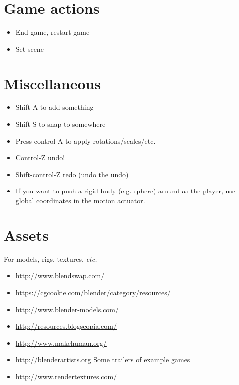 \documentclass[]{article}
\newcommand{\bi}{\begin{itemize}}
\newcommand{\ii}{\item}
\newcommand{\ei}{\end{itemize}}
\newcommand{\sect}[1]{\section{\bf #1}}
\begin{document}
\sect{Game actions}
\bi
\ii End game, restart game
\ii Set scene
\ei

\sect{Miscellaneous}

\bi
\ii Shift-A to add something
\ii Shift-S to snap to somewhere
\ii Press control-A to apply rotations/scales/etc.
\ii Control-Z undo!
\ii Shift-control-Z redo (undo the undo)
\ii If you want to push a rigid body (e.g. sphere) around as the player,
use global coordinates in the motion actuator. 
\ei

\sect{Assets}
For models, rigs, textures, {\em etc.}
\bi
\ii\url{http://www.blendswap.com/}
\ii\url{https://cgcookie.com/blender/category/resources/}
\ii\url{http://www.blender-models.com/}
\ii\url{http://resources.blogscopia.com/}
\ii\url{http://www.makehuman.org/}
\ii\url{http://blenderartists.org} Some trailers of example games
\ii\url{http://www.rendertextures.com/}
\ei
\end{document}
